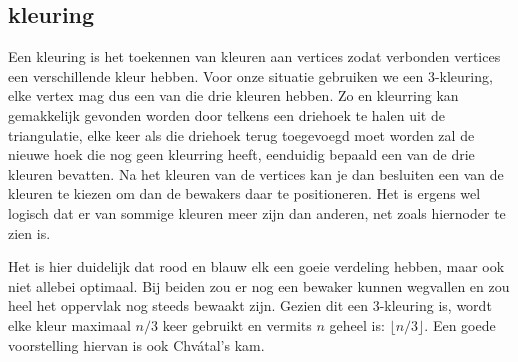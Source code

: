 \documentclass[12pt,a4paper]{article}
\begin{document}
	
	\subsection{kleuring}
	Een kleuring is het toekennen van kleuren aan vertices zodat verbonden vertices een verschillende kleur hebben. Voor onze situatie gebruiken we een 3-kleuring, elke vertex mag dus een van die drie kleuren hebben. Zo en kleurring kan gemakkelijk gevonden worden door telkens een driehoek te halen uit de triangulatie, elke keer als die driehoek terug toegevoegd moet worden zal de nieuwe hoek die nog geen kleurring heeft, eenduidig bepaald een van de drie kleuren bevatten. Na het kleuren van de vertices kan je dan besluiten een van de kleuren te kiezen om dan de bewakers daar te positioneren. Het is ergens wel logisch dat er van sommige kleuren meer zijn dan anderen, net zoals hiernoder te zien is. 
	\begin{figure}[h]
		\centering
		\label{fig:trianuglation-colours}
	\end{figure}
	Het is hier duidelijk dat rood en blauw elk een goeie verdeling hebben, maar ook niet allebei optimaal. Bij beiden zou er nog een bewaker kunnen wegvallen en zou heel het oppervlak nog steeds bewaakt zijn. Gezien dit een 3-kleuring is, wordt elke kleur maximaal $n/3$ keer gebruikt en vermits $n$ geheel is: $\lfloor n/3 \rfloor$. Een goede voorstelling hiervan is ook Chvátal's kam. 
\end{document}
